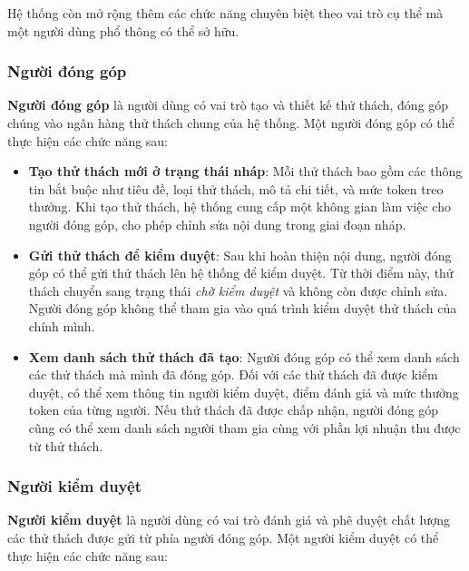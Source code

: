 Hệ thống còn mở rộng thêm các chức năng chuyên biệt theo vai trò cụ thể mà một người dùng phổ thông có thể sở hữu.

\subsubsection{Người đóng góp}

\textbf{Người đóng góp} là người dùng có vai trò tạo và thiết kế thử thách, đóng góp chúng vào ngân hàng thử thách chung của hệ thống. Một người đóng góp có thể thực hiện các chức năng sau:

\begin{itemize}
  \item \textbf{Tạo thử thách mới ở trạng thái nháp}: Mỗi thử thách bao gồm các thông tin bắt buộc như tiêu đề, loại thử thách, mô tả chi tiết, và mức token treo thưởng.
        Khi tạo thử thách, hệ thống cung cấp một không gian làm việc cho người đóng góp, cho phép chỉnh sửa nội dung trong giai đoạn nháp.
  \item \textbf{Gửi thử thách để kiểm duyệt}: Sau khi hoàn thiện nội dung, người đóng góp có thể gửi thử thách lên hệ thống để kiểm duyệt. Từ thời điểm này, thử thách chuyển sang trạng thái \textit{chờ kiểm duyệt} và không còn được chỉnh sửa.
        Người đóng góp không thể tham gia vào quá trình kiểm duyệt thử thách của chính mình.
  \item \textbf{Xem danh sách thử thách đã tạo}: Người đóng góp có thể xem danh sách các thử thách mà mình đã đóng góp. Đối với các thử thách đã được kiểm duyệt, có thể xem thông tin người kiểm duyệt, điểm đánh giá và mức thưởng token của từng người.
        Nếu thử thách đã được chấp nhận, người đóng góp cũng có thể xem danh sách người tham gia cùng với phần lợi nhuận thu được từ thử thách.
\end{itemize}

\subsubsection{Người kiểm duyệt}

\textbf{Người kiểm duyệt} là người dùng có vai trò đánh giá và phê duyệt chất lượng các thử thách được gửi từ phía người đóng góp. Một người kiểm duyệt có thể thực hiện các chức năng sau:

